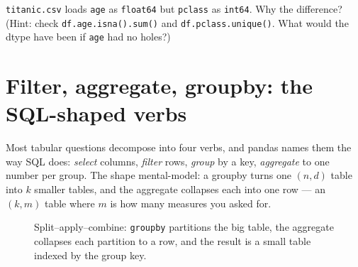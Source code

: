 \begin{checkpoint}
\texttt{titanic.csv} loads \texttt{age} as \texttt{float64} but
\texttt{pclass} as \texttt{int64}. Why the difference? (Hint: check
\texttt{df.age.isna().sum()} and \texttt{df.pclass.unique()}. What would the
dtype have been if \texttt{age} had no holes?)
\end{checkpoint}

\section{Filter, aggregate, groupby: the SQL-shaped verbs}\label{sec:groupby}

Most tabular questions decompose into four verbs, and pandas names them the
way SQL does: \emph{select} columns, \emph{filter} rows, \emph{group} by a
key, \emph{aggregate} to one number per group. The shape mental-model: a
groupby turns one $(n, d)$ table into $k$ smaller tables, and the aggregate
collapses each into one row --- an $(k, m)$ table where $m$ is how many
measures you asked for.

\begin{figure}[ht]\centering
{}
\caption{Split--apply--combine: \texttt{groupby} partitions the big table,
the aggregate collapses each partition to a row, and the result is a small
table indexed by the group key.}\label{fig:groupby-flow}
\end{figure}

